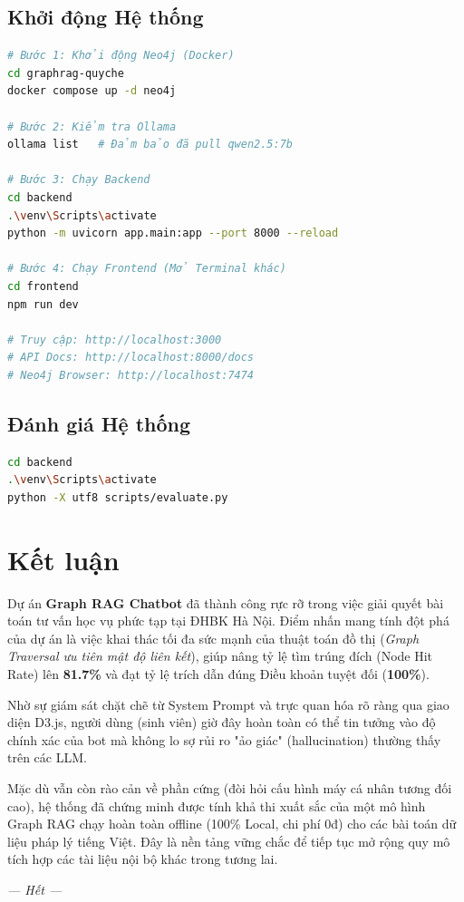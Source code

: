 \documentclass[12pt,a4paper]{article}
\begin{document}
\subsection{Khởi động Hệ thống}
\begin{lstlisting}[language=bash, caption=Các bước khởi động hệ thống]
# Bước 1: Khởi động Neo4j (Docker)
cd graphrag-quyche
docker compose up -d neo4j

# Bước 2: Kiểm tra Ollama
ollama list   # Đảm bảo đã pull qwen2.5:7b

# Bước 3: Chạy Backend
cd backend
.\venv\Scripts\activate
python -m uvicorn app.main:app --port 8000 --reload

# Bước 4: Chạy Frontend (Mở Terminal khác)
cd frontend
npm run dev

# Truy cập: http://localhost:3000
# API Docs: http://localhost:8000/docs
# Neo4j Browser: http://localhost:7474
\end{lstlisting}

\subsection{Đánh giá Hệ thống}
\begin{lstlisting}[language=bash, caption=Chạy kiểm thử 50 câu hỏi]
cd backend
.\venv\Scripts\activate
python -X utf8 scripts/evaluate.py
\end{lstlisting}

\section{Kết luận}
Dự án \textbf{Graph RAG Chatbot} đã thành công rực rỡ trong việc giải quyết bài toán tư vấn học vụ phức tạp tại ĐHBK Hà Nội. Điểm nhấn mang tính đột phá của dự án là việc khai thác tối đa sức mạnh của thuật toán đồ thị (\textit{Graph Traversal ưu tiên mật độ liên kết}), giúp nâng tỷ lệ tìm trúng đích (Node Hit Rate) lên \textbf{81.7\%} và đạt tỷ lệ trích dẫn đúng Điều khoản tuyệt đối (\textbf{100\%}).

Nhờ sự giám sát chặt chẽ từ System Prompt và trực quan hóa rõ ràng qua giao diện D3.js, người dùng (sinh viên) giờ đây hoàn toàn có thể tin tưởng vào độ chính xác của bot mà không lo sợ rủi ro "ảo giác" (hallucination) thường thấy trên các LLM.

Mặc dù vẫn còn rào cản về phần cứng (đòi hỏi cấu hình máy cá nhân tương đối cao), hệ thống đã chứng minh được tính khả thi xuất sắc của một mô hình Graph RAG chạy hoàn toàn offline (100\% Local, chi phí 0đ) cho các bài toán dữ liệu pháp lý tiếng Việt. Đây là nền tảng vững chắc để tiếp tục mở rộng quy mô tích hợp các tài liệu nội bộ khác trong tương lai.

\vspace{1cm}
\begin{center}
\textit{--- Hết ---}
\end{center}
\end{document}
